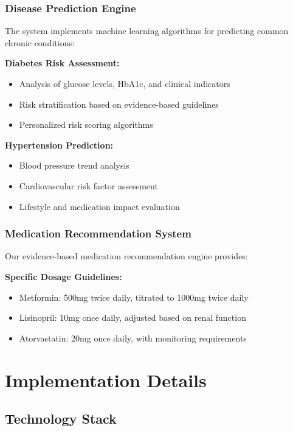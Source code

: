 \documentclass[conference]{IEEEtran}
\begin{document}
\subsubsection{Disease Prediction Engine}

The system implements machine learning algorithms for predicting common chronic conditions:

\textbf{Diabetes Risk Assessment:}
\begin{itemize}
    \item Analysis of glucose levels, HbA1c, and clinical indicators
    \item Risk stratification based on evidence-based guidelines
    \item Personalized risk scoring algorithms
\end{itemize}

\textbf{Hypertension Prediction:}
\begin{itemize}
    \item Blood pressure trend analysis
    \item Cardiovascular risk factor assessment
    \item Lifestyle and medication impact evaluation
\end{itemize}

\subsubsection{Medication Recommendation System}

Our evidence-based medication recommendation engine provides:

\textbf{Specific Dosage Guidelines:}
\begin{itemize}
    \item Metformin: 500mg twice daily, titrated to 1000mg twice daily
    \item Lisinopril: 10mg once daily, adjusted based on renal function
    \item Atorvastatin: 20mg once daily, with monitoring requirements
\end{itemize}

\section{Implementation Details}

\subsection{Technology Stack}
\end{document}

